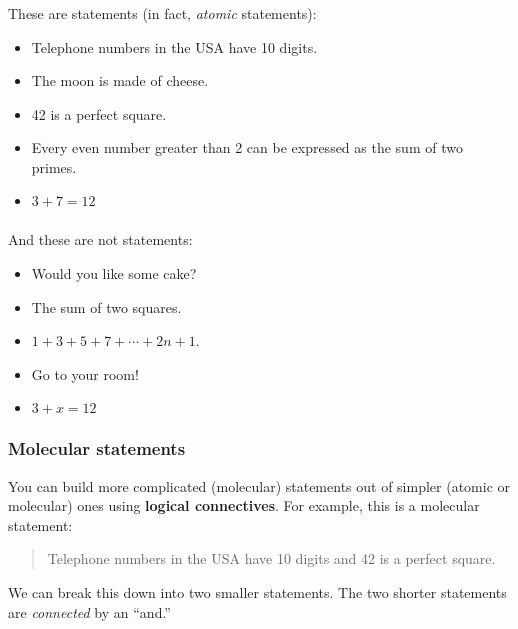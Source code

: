 \documentclass[11pt, compress]{beamer}
\newcommand{\terminology}[1]{\textbf{#1}}\newcommand{\lt}{<}
\begin{document}
\begin{frame}
\frametitle{}
\begin{example}[0.2.1]These are statements (in fact, \emph{atomic} statements):\begin{itemize}
\item{} Telephone numbers in the USA have 10 digits.


\item{} The moon is made of cheese.


\item{} 42 is a perfect square.


\item{} Every even number greater than 2 can be expressed as the sum of two primes.


\item{} \(3+7 = 12\)

\end{itemize}

\end{example}
\end{frame}
 
\begin{frame}
\frametitle{}
\begin{example}[0.2.1]And these are not statements:\begin{itemize}
\item{} Would you like some cake?


\item{} The sum of two squares.


\item{} \(1+3+5+7+\cdots+2n+1\).

\item{} Go to your room!


\item{} \(3+x = 12\)

\end{itemize}

\end{example}
\end{frame}
 
\begin{frame}
\frametitle{Molecular statements}
 You can build more complicated (molecular) statements out of simpler (atomic or molecular) ones using \terminology{logical connectives}. For example, this is a molecular statement:
 \begin{quote}%
Telephone numbers in the USA have 10 digits and 42 is a perfect square.
\end{quote}
 
\pause \vfill 

We can break this down into two smaller statements. The two shorter statements are \emph{connected} by an ``and.''
\end{frame}
 
\end{document}
